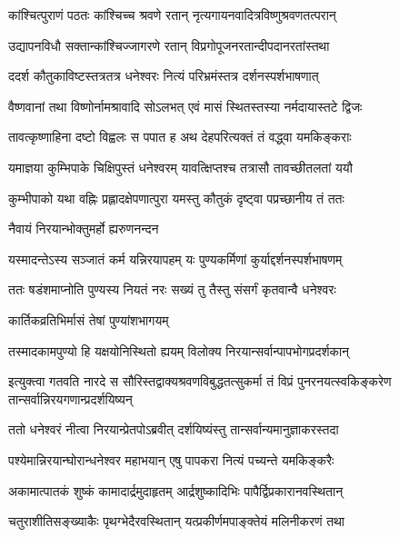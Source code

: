 \twolineshloka
{कांश्चित्पुराणं पठतः कांश्चिच्च श्रवणे रतान्}
{नृत्यगायनवादित्रविष्णुश्रवणतत्परान्} %

\twolineshloka
{उद्यापनविधौ सक्तान्कांश्चिज्जागरणे रतान्}
{विप्रगोपूजनरतान्दीपदानरतांस्तथा} %

\twolineshloka
{ददर्श कौतुकाविष्टस्तत्रतत्र धनेश्वरः}
{नित्यं परिभ्रमंस्तत्र दर्शनस्पर्शभाषणात्} %

\twolineshloka
{वैष्णवानां तथा विष्णोर्नामश्रावादि सोऽलभत्}
{एवं मासं स्थितस्तस्या नर्मदायास्तटे द्विजः} %

\twolineshloka
{तावत्कृष्णाहिना दष्टो विह्वलः स पपात ह}
{अथ देहपरित्यक्तं तं वद्ध्वा यमकिङ्कराः} %

\twolineshloka
{यमाज्ञया कुम्भिपाके चिक्षिपुस्तं धनेश्वरम्}
{यावत्क्षिप्तश्च तत्रासौ तावच्छीतलतां ययौ} %

\twolineshloka
{कुम्भीपाको यथा वह्निः प्रह्लादक्षेपणात्पुरा}
{यमस्तु कौतुकं दृष्ट्वा पप्रच्छानीय तं ततः} %




\onelineshloka
{नैवायं निरयान्भोक्तुमर्हो ह्यरुणनन्दन} %

\twolineshloka
{यस्मादन्तेऽस्य सञ्जातं कर्म यन्निरयापहम्}
{यः पुण्यकर्मिणां कुर्याद्दर्शनस्पर्शभाषणम्} %

\twolineshloka
{ततः षडंशमाप्नोति पुण्यस्य नियतं नरः}
{सख्यं तु तैस्तु संसर्गं कृतवान्वै धनेश्वरः} %


\onelineshloka
{कार्तिकव्रतिभिर्मासं तेषां पुण्यांशभागयम्} %

\twolineshloka
{तस्मादकामपुण्यो हि यक्षयोनिस्थितो ह्ययम्}
{विलोक्य निरयान्सर्वान्पापभोगप्रदर्शकान्} %


\twolineshloka
{इत्युक्त्वा गतवति नारदे स सौरिस्तद्वाक्यश्रवणविबुद्धतत्सुकर्मा}
{तं विप्रं पुनरनयत्स्वकिङ्करेण तान्सर्वान्निरयगणान्प्रदर्शयिष्यन्} %


\twolineshloka
{ततो धनेश्वरं नीत्वा निरयान्प्रेतपोऽब्रवीत्}
{दर्शयिष्यंस्तु तान्सर्वान्यमानुज्ञाकरस्तदा} %


\twolineshloka
{पश्येमान्निरयान्घोरान्धनेश्वर महाभयान्}
{एषु पापकरा नित्यं पच्यन्ते यमकिङ्करैः} %

\twolineshloka
{अकामात्पातकं शुष्कं कामादार्द्रमुदाहृतम्}
{आर्द्रशुष्कादिभिः पापैर्द्विप्रकारानवस्थितान्} %

\twolineshloka
{चतुराशीतिसङ्ख्याकैः पृथग्भेदैरवस्थितान्}
{यत्प्रकीर्णमपाङ्क्तेयं मलिनीकरणं तथा} %

